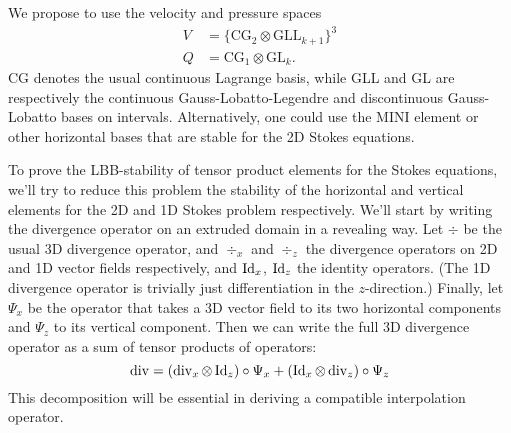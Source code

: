 \documentclass{article}
\theoremstyle{definition}
\theoremstyle{plain}
\renewcommand{\div}[1]{\operatorname{div} #1} %
\newcommand{\Id}[1]{\operatorname{Id} #1}
\begin{document}
We propose to use the velocity and pressure spaces
\begin{align}
    V & = \{\text{CG}_2 \otimes \text{GLL}_{k + 1}\}^3 \\
    Q & = \text{CG}_1 \otimes \text{GL}_k.
\end{align}
CG denotes the usual continuous Lagrange basis, while GLL and GL are respectively the continuous Gauss-Lobatto-Legendre and discontinuous Gauss-Lobatto bases on intervals.
Alternatively, one could use the MINI element or other horizontal bases that are stable for the 2D Stokes equations.

To prove the LBB-stability of tensor product elements for the Stokes equations, we'll try to reduce this problem the stability of the horizontal and vertical elements for the 2D and 1D Stokes problem respectively.
We'll start by writing the divergence operator on an extruded domain in a revealing way.
Let $\div$ be the usual 3D divergence operator, and $\div_x$ and $\div_z$ the divergence operators on 2D and 1D vector fields respectively, and $\Id_x$, $\Id_z$ the identity operators.
(The 1D divergence operator is trivially just differentiation in the $z$-direction.)
Finally, let $\Psi_x$ be the operator that takes a 3D vector field to its two horizontal components and $\Psi_z$ to its vertical component.
Then we can write the full 3D divergence operator as a sum of tensor products of operators:
\begin{equation}
    \div = (\div_x \otimes \Id_z)\circ\Psi_x + (\Id_x \otimes \div_z)\circ\Psi_z
    \label{eq:divergence-breakdown}
\end{equation}
This decomposition will be essential in deriving a compatible interpolation operator.
\end{document}
